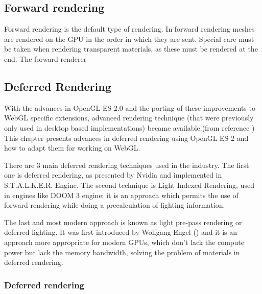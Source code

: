 \subsection{Forward rendering}

Forward rendering is the default type of rendering. In forward rendering meshes are rendered on the GPU in the order in which they are sent. Special care must be taken when rendering transparent materials, as these must be rendered at the end. The forward renderer 

\subsection{Deferred Rendering}

With the advances in OpenGL ES 2.0 and the porting of these improvements to WebGL specific extensions, advanced rendering technique (that were previously only used in desktop based implementations) became available.(from reference \cite{engel14}) This chapter presents advances in deferred rendering using OpenGL ES 2 and how to adapt them for working on WebGL. 

There are 3 main deferred rendering techniques used in the industry. The first one is deferred rendering, as presented by Nvidia and implemented in S.T.A.L.K.E.R. Engine. The second technique is Light Indexed Rendering, used in engines like DOOM 3 engine; \cite{trebilco07} it is an approach which permits the use of forward rendering while doing a precalculation of lighting information.

The last and most modern approach is known as light pre-pass rendering or deferred lighting. It was first introduced by Wolfgang Engel (\cite{engel08}) and it is an approach more appropriate for modern GPUs, which don’t lack the compute power but lack the memory bandwidth, solving the problem of materials in deferred rendering.

\subsubsection{Deferred rendering}

